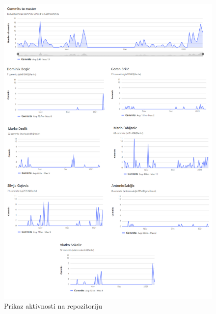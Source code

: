 		\begin{figure}[h]
			\includegraphics[scale=0.58]{slike/Aktivnost.PNG}
			\centering
			\caption{Prikaz aktivnosti na repozitoriju}
			\label{fig:aktivnost}
		\end{figure}
		
	